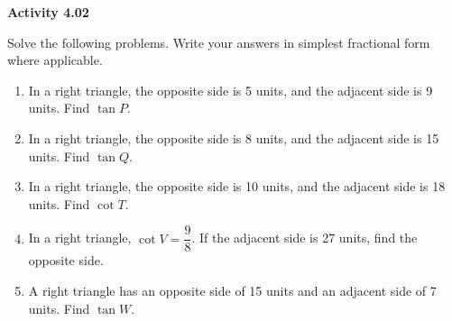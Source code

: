 \vspace{0.3ex}
\noindent\textbf{Activity 4.02}

\vspace{0.2ex}

Solve the following problems. Write your answers in simplest fractional form where applicable.

\begin{enumerate}
    \item In a right triangle, the opposite side is 5 units, and the adjacent side is 9 units. Find $\tan P$.
    \item In a right triangle, the opposite side is 8 units, and the adjacent side is 15 units. Find $\tan Q$.
    \item In a right triangle, the opposite side is 10 units, and the adjacent side is 18 units. Find $\cot T$.
    \item In a right triangle, $\cot V = \dfrac{9}{8}$. If the adjacent side is 27 units, find the opposite side.
    \item A right triangle has an opposite side of 15 units and an adjacent side of 7 units. Find $\tan W$.
\end{enumerate}
